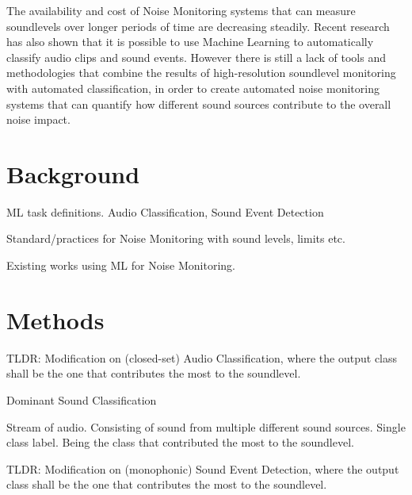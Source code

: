 \documentclass[a4paper,12pt]{article}
\begin{document}
The availability and cost of Noise Monitoring systems that can measure soundlevels
over longer periods of time are decreasing steadily.
Recent research has also shown that it is possible to use Machine Learning 
to automatically classify audio clips and sound events.
However there is still a lack of tools and methodologies that combine the results
of high-resolution soundlevel monitoring with automated classification,
in order to create automated noise monitoring systems that can quantify
how different sound sources contribute to the overall noise impact.


\clearpage
\section{Background}


ML task definitions. Audio Classification, Sound Event Detection

Standard/practices for Noise Monitoring with sound levels, limits etc.

Existing works using ML for Noise Monitoring.

\clearpage
\section{Methods}

\renewcommand{\algorithmicrequire}{\textbf{Input:}}
\renewcommand{\algorithmicensure}{\textbf{Output:}}

TLDR: Modification on (closed-set) Audio Classification,
where the output class shall be the one that contributes the most to the soundlevel.
\begin{algorithm}
\caption{Dominant Sound Classification}\label{alg:cap}
\begin{algorithmic}
\Require Stream of audio.
Consisting of sound from multiple different sound sources.
\Ensure Single class label.
Being the class that contributed the most to the soundlevel.
\end{algorithmic}
\end{algorithm}

TLDR: Modification on (monophonic) Sound Event Detection,
where the output class shall be the one that contributes the most to the soundlevel.
\end{document}
